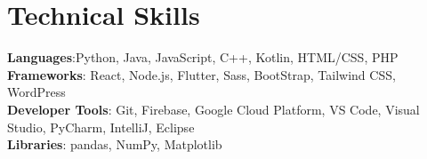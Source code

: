 \documentclass[letterpaper,11pt]{article}
\begin{document}
\section{Technical Skills}
 \begin{itemize}[leftmargin=0.15in, label={}]
    \small{\item{
     \textbf{Languages}{:Python, Java, JavaScript, C++, Kotlin,  HTML/CSS, PHP} \\ \vspace{3pt}
     \textbf{Frameworks}{: React, Node.js, Flutter, Sass, BootStrap, Tailwind CSS, WordPress} \\ \vspace{3pt}
     \textbf{Developer Tools}{: Git, Firebase, Google Cloud Platform, VS Code, Visual Studio, PyCharm, IntelliJ, Eclipse} \\ \vspace{3pt}
     \textbf{Libraries}{: pandas, NumPy, Matplotlib}
    }}
 \end{itemize}



  
  
\end{document}
